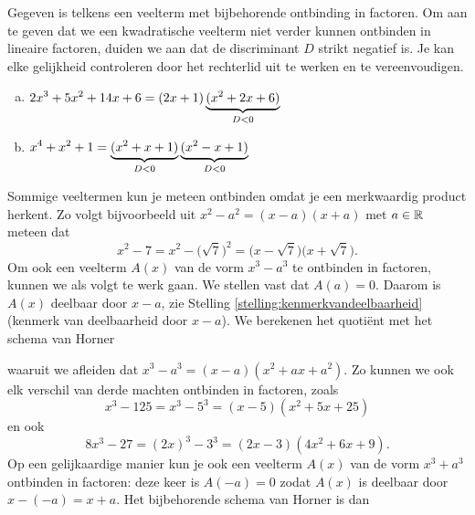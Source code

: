 \documentclass{ximera}
\begin{document}
\begin{example} 
Gegeven is telkens een veelterm met bijbehorende ontbinding in factoren. Om aan te geven dat we een kwadratische veelterm niet verder kunnen ontbinden in lineaire factoren, duiden we aan dat de discriminant $D$ strikt negatief is. Je kan elke gelijkheid controleren door het rechterlid uit te werken en te vereenvoudigen. 
\begin{enumerate}[(a)]
\item
$\displaystyle 2x^3 + 5x^2 + 14x + 6 = (2x+1)\underbrace{(x^2+2x+6)}_{D < 0}$
\item
$\displaystyle x^4+x^2+1 = \underbrace{(x^2+x+1)}_{D < 0}\underbrace{(x^2-x+1)}_{D < 0}$
\end{enumerate}
\end{example} 



Sommige veeltermen kun je meteen ontbinden omdat je een merkwaardig product herkent. Zo volgt bijvoorbeeld uit $x^2 - a^2 = (x-a)(x+a)$ met $a \in \mathbb{R}$ meteen dat
\[
x^2 - 7 = x^2 - \bigl(\sqrt{7}\bigr)^2 = \bigl(x-\sqrt{7})(x+\sqrt{7}\bigr). 
\]
Om ook een veelterm $A(x)$ van de vorm $x^3 - a^3$ te ontbinden in factoren, kunnen we als volgt te werk gaan.
We stellen vast dat $A(a) = 0$. Daarom is $A(x)$ deelbaar door $x-a$, zie Stelling \ref{stelling:kenmerkvandeelbaarheid} (kenmerk van deelbaarheid door $x-a$). We berekenen het quotiënt met het schema van Horner
\renewcommand{\kolbreed}{\widthof{$-a^3$}}


waaruit we afleiden dat $x^3 - a^3 = (x-a)(x^2 + ax + a^2)$. Zo kunnen we ook elk verschil van derde machten ontbinden in factoren, zoals
\[
x^3 - 125 = x^3 - 5^3 = (x-5)(x^2 + 5x + 25) 
\]
en ook
\[
8x^3 - 27 = (2x)^3 - 3^3 = (2x-3)(4x^2+6x+9).
\]
Op een gelijkaardige manier kun je ook een veelterm $A(x)$ van de vorm $x^3 + a^3$ ontbinden in factoren: deze keer is $A(-a) = 0$ zodat $A(x)$ is deelbaar door $x-(-a) = x+a$. Het bijbehorende schema van Horner is dan
\renewcommand{\kolbreed}{\widthof{$-a^3$}}

\end{document}
